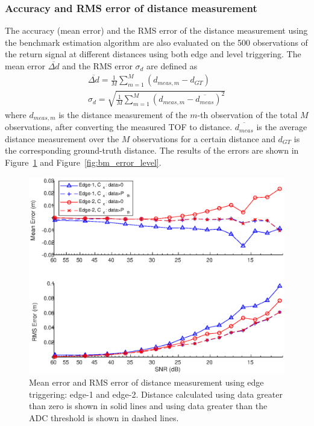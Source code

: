 \subsubsection{Accuracy and RMS error of distance measurement}
The accuracy (mean error) and the RMS error of the distance measurement using the benchmark estimation algorithm are also evaluated on the 500 observations of the return signal at different distances using both edge and level triggering. The mean error $\overline{\Delta d}$ and the RMS error $\sigma_d$ are defined as
\begin{align}
\overline{\Delta d} = \frac{1}{M}\sum_{m=1}^{M}(d_{meas,m} - d_{GT})\\
\sigma_d = \sqrt{\frac{1}{M}\sum_{m=1}^{M}(d_{meas, m}-\overline{d_{meas}})^2}
\end{align}
where $d_{meas, m}$ is the distance measurement of the $m$-th observation of the total $M$ observations, after converting the measured TOF to distance. $\overline{d_{meas}}$ is the average distance measurement over the $M$ observations for a certain distance and $d_{GT}$ is the corresponding ground-truth distance. The results of the errors are shown in Figure~\ref{fig:bm_error_edge} and Figure~\ref{fig:bm_error_level}.
\begin{figure}[t!p]
\centering
\graphicspath{{figures/}}
\includegraphics[width=.8\textwidth]{figures/chapter6_ADC/error_snr_edge.eps}
\caption{Mean error and RMS error of distance measurement using edge triggering: edge-1 and edge-2. Distance calculated using data greater than zero is shown in solid lines and using data greater than the ADC threshold is shown in dashed lines.}
\label{fig:bm_error_edge}
\end{figure}%
